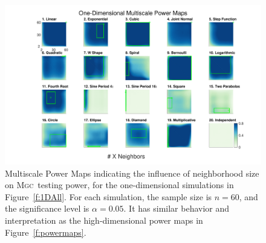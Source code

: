 \documentclass[11pt]{article}
\providecommand{\sct}[1]{{\normalfont\textsc{#1}}}
\newcommand{\Mgc}{\sct{Mgc}}
\begin{document}
\begin{figure}[htbp]
\includegraphics[width=1.0\textwidth,trim={3cm 0.5cm 2.5cm 0.5cm},clip]{Figures/Fig1DHeat}
\caption{Multiscale Power Maps indicating the influence of neighborhood size on \Mgc~testing power, for the one-dimensional simulations in Figure~\ref{f:1DAll}. For each simulation,  the sample size is $n=60$, and the significance level is $\alpha=0.05$. It has similar behavior and interpretation as the high-dimensional power maps in Figure~\ref{f:powermaps}.}
\label{f:powermaps1}
\end{figure}
\end{document}
